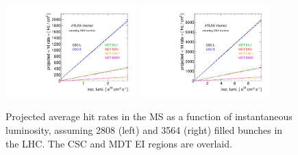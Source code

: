 \begin{figure}
  \begin{center}
    \includegraphics[width=0.45\textwidth]{./figures/extrapolate_vs_lumi_adc_2808.pdf}
    \includegraphics[width=0.45\textwidth]{./figures/extrapolate_vs_lumi_adc_3564.pdf}
    \caption{Projected average hit rates in the MS as a function of instantaneous luminosity, assuming 2808 (left) and 3564 (right) filled bunches in the LHC. The CSC and MDT EI regions are overlaid.}
    \label{fig:extrapolations-hitrates-adc}
  \end{center}
\end{figure}


